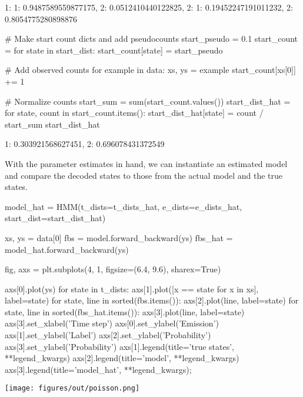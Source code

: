 \begin{NotebookOut}
{1: {1: 0.9487589559877175, 2: 0.0512410440122825},
 2: {1: 0.19452247191011232, 2: 0.8054775280898876}}
\end{NotebookOut}

\begin{NotebookIn}
# Make start count dicts and add pseudocounts
start_pseudo = 0.1
start_count = {}
for state in start_dist:
    start_count[state] = start_pseudo

# Add observed counts
for example in data:
    xs, ys = example
    start_count[xs[0]] += 1

# Normalize counts
start_sum = sum(start_count.values())
start_dist_hat = {}
for state, count in start_count.items():
    start_dist_hat[state] = count / start_sum
start_dist_hat
\end{NotebookIn}

\begin{NotebookOut}
{1: 0.303921568627451, 2: 0.696078431372549}
\end{NotebookOut}

With the parameter estimates in hand, we can instantiate an estimated model and compare the decoded states to those from the actual model and the true states.

\begin{NotebookIn}
model_hat = HMM(t_dists=t_dists_hat,
                e_dists=e_dists_hat,
                start_dist=start_dist_hat)

xs, ys = data[0]
fbs = model.forward_backward(ys)
fbs_hat = model_hat.forward_backward(ys)

fig, axs = plt.subplots(4, 1, figsize=(6.4, 9.6), sharex=True)

axs[0].plot(ys)
for state in t_dists:
    axs[1].plot([x == state for x in xs], label=state)
for state, line in sorted(fbs.items()):
    axs[2].plot(line, label=state)
for state, line in sorted(fbs_hat.items()):
    axs[3].plot(line, label=state)
axs[3].set_xlabel('Time step')
axs[0].set_ylabel('Emission')
axs[1].set_ylabel('Label')
axs[2].set_ylabel('Probability')
axs[3].set_ylabel('Probability')
axs[1].legend(title='true states', **legend_kwargs)
axs[2].legend(title='model', **legend_kwargs)
axs[3].legend(title='model_hat', **legend_kwargs);
\end{NotebookIn}

\begin{NotebookImage}
\texttt{[image: figures/out/poisson.png]}
\end{NotebookImage}

